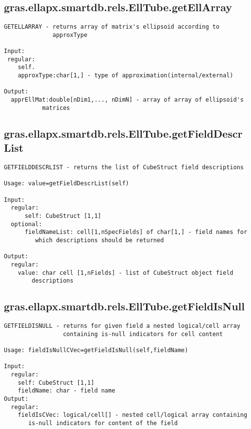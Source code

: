 \subsection{\texorpdfstring{gras.ellapx.smartdb.rels.EllTube.getEllArray}{getEllArray}}\label{method:gras.ellapx.smartdb.rels.EllTube.getEllArray}
\begin{verbatim}
GETELLARRAY - returns array of matrix's ellipsoid according to
              approxType

Input:
 regular:
    self.
    approxType:char[1,] - type of approximation(internal/external)

Output:
  apprEllMat:double[nDim1,..., nDimN] - array of array of ellipsoid's
           matrices
\end{verbatim}
\subsection{\texorpdfstring{gras.ellapx.smartdb.rels.EllTube.getFieldDescrList}{getFieldDescrList}}\label{method:gras.ellapx.smartdb.rels.EllTube.getFieldDescrList}
\begin{verbatim}
GETFIELDDESCRLIST - returns the list of CubeStruct field descriptions

Usage: value=getFieldDescrList(self)

Input:
  regular:
      self: CubeStruct [1,1]
  optional:
      fieldNameList: cell[1,nSpecFields] of char[1,] - field names for
         which descriptions should be returned

Output:
  regular:
    value: char cell [1,nFields] - list of CubeStruct object field
        descriptions
\end{verbatim}
\subsection{\texorpdfstring{gras.ellapx.smartdb.rels.EllTube.getFieldIsNull}{getFieldIsNull}}\label{method:gras.ellapx.smartdb.rels.EllTube.getFieldIsNull}
\begin{verbatim}
GETFIELDISNULL - returns for given field a nested logical/cell array
                 containing is-null indicators for cell content

Usage: fieldIsNullCVec=getFieldIsNull(self,fieldName)

Input:
  regular:
    self: CubeStruct [1,1]
    fieldName: char - field name
Output:
  regular:
    fieldIsCVec: logical/cell[] - nested cell/logical array containing
       is-null indicators for content of the field
\end{verbatim}
